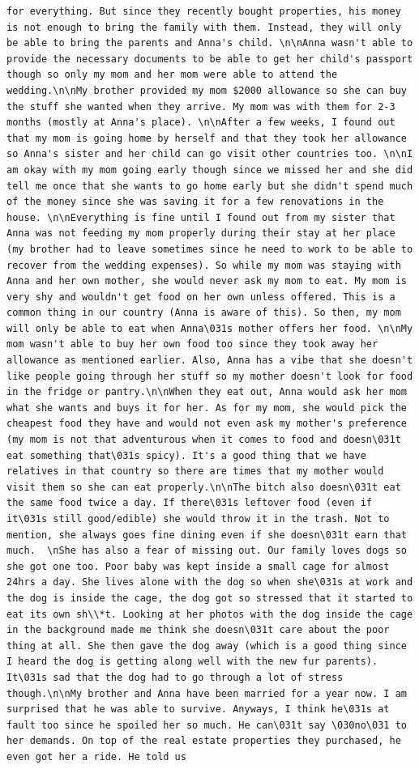 \documentclass[
  letterpaper,
  DIV=11,
  numbers=noendperiod]{scrreprt}
\begin{document}
\begin{verbatim}
for everything. But since they recently bought properties, his money is not enough to bring the family with them. Instead, they will only be able to bring the parents and Anna's child. \n\nAnna wasn't able to provide the necessary documents to be able to get her child's passport though so only my mom and her mom were able to attend the wedding.\n\nMy brother provided my mom $2000 allowance so she can buy the stuff she wanted when they arrive. My mom was with them for 2-3 months (mostly at Anna's place). \n\nAfter a few weeks, I found out that my mom is going home by herself and that they took her allowance so Anna's sister and her child can go visit other countries too. \n\nI am okay with my mom going early though since we missed her and she did tell me once that she wants to go home early but she didn't spend much of the money since she was saving it for a few renovations in the house. \n\nEverything is fine until I found out from my sister that Anna was not feeding my mom properly during their stay at her place (my brother had to leave sometimes since he need to work to be able to recover from the wedding expenses). So while my mom was staying with Anna and her own mother, she would never ask my mom to eat. My mom is very shy and wouldn't get food on her own unless offered. This is a common thing in our country (Anna is aware of this). So then, my mom will only be able to eat when Anna\031s mother offers her food. \n\nMy mom wasn't able to buy her own food too since they took away her allowance as mentioned earlier. Also, Anna has a vibe that she doesn't like people going through her stuff so my mother doesn't look for food in the fridge or pantry.\n\nWhen they eat out, Anna would ask her mom what she wants and buys it for her. As for my mom, she would pick the cheapest food they have and would not even ask my mother's preference (my mom is not that adventurous when it comes to food and doesn\031t eat something that\031s spicy). It's a good thing that we have relatives in that country so there are times that my mother would visit them so she can eat properly.\n\nThe bitch also doesn\031t eat the same food twice a day. If there\031s leftover food (even if it\031s still good/edible) she would throw it in the trash. Not to mention, she always goes fine dining even if she doesn\031t earn that much.  \nShe has also a fear of missing out. Our family loves dogs so she got one too. Poor baby was kept inside a small cage for almost 24hrs a day. She lives alone with the dog so when she\031s at work and the dog is inside the cage, the dog got so stressed that it started to eat its own sh\\*t. Looking at her photos with the dog inside the cage in the background made me think she doesn\031t care about the poor thing at all. She then gave the dog away (which is a good thing since I heard the dog is getting along well with the new fur parents). It\031s sad that the dog had to go through a lot of stress though.\n\nMy brother and Anna have been married for a year now. I am surprised that he was able to survive. Anyways, I think he\031s at fault too since he spoiled her so much. He can\031t say \030no\031 to her demands. On top of the real estate properties they purchased, he even got her a ride. He told us 
\end{verbatim}
\end{document}
